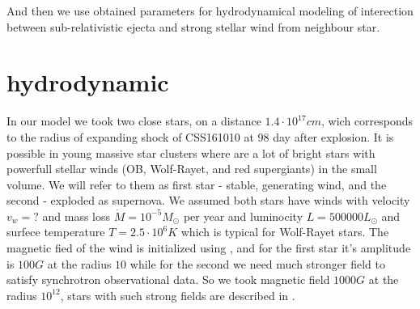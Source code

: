 \documentclass[a4paper,12pt]{extreport}
\begin{document}
And then we use obtained parameters for hydrodynamical modeling of interection between sub-relativistic ejecta and strong stellar wind from neighbour star.
\section{hydrodynamic}\label{hydrodynamic}
In our model we took two close stars, on a distance $1.4\cdot10^{17} cm$, wich corresponds to the radius of expanding shock of CSS161010 at 98 day after explosion. It is  possible in young massive star clusters where are a lot of bright stars with powerfull stellar winds (OB, Wolf-Rayet, and red supergiants) in the small volume. We will refer to them as first star - stable, generating wind, and the second - exploded as supernova. We assumed both stars have winds with velocity $v_w = ?$ and mass loss $\dot{M} = 10^{-5} M_\odot $ per year and luminocity $L=500000 L_\odot$ and surfece temperature $T = 2.5\cdot10^6 K$ which is typical for Wolf-Rayet stars. The magnetic fied of the wind is initialized using \cite{}, and for the first star  it's amplitude is $100 G$ at the radius $10$ while for the second we need much stronger field to satisfy synchrotron observational data. So we took magnetic field $1000 G$ at the radius $10^{12}$, stars with such strong fields are described in \cite{}.
\end{document}
